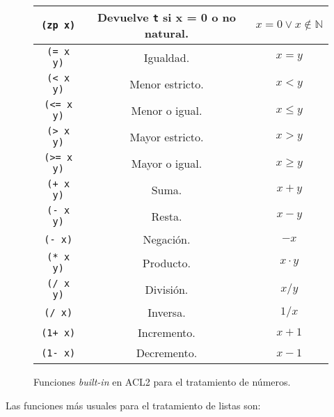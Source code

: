 \documentclass[a4paper,10pt]{article}
\begin{document}
\begin{figure}[ht]
\begin{center}
\begin{tabular}{||c|c|c||}
\hline
\texttt{(zp x)} & Devuelve \texttt{t} si x = 0 o no natural. & $x = 0\vee x \notin \mathbb{N}$\\
\hline
\texttt{(= x y)} & Igualdad. & $x = y$\\
\hline
\texttt{(< x y)} & Menor estricto. & $x < y$\\
\hline
\texttt{(<= x y)} & Menor o igual. & $x \leq y$\\
\hline
\texttt{(> x y)} & Mayor estricto. & $x > y$\\
\hline
\texttt{(>= x y)} & Mayor o igual. & $x \geq y$\\
\hline
\texttt{(+ x y)} & Suma. & $x + y$\\
\hline
\texttt{(- x y)} & Resta. & $x - y$\\
\hline
\texttt{(- x)} & Negación. & $-x$\\
\hline
\texttt{(* x y)} & Producto. & $x\cdot y$\\
\hline
\texttt{(/ x y)} & División. & $x/y$\\
\hline
\texttt{(/ x)} & Inversa. & $1/x$\\
\hline
\texttt{(1+ x)} & Incremento. & $x + 1$\\
\hline
\texttt{(1- x)} & Decremento. & $x - 1$\\
\hline
\end{tabular}
\end{center}
\caption{Funciones \emph{built-in} en ACL2 para el tratamiento de números.}
\end{figure}

\newpage
\par\vspace{10pt}

Las funciones más usuales para el tratamiento de listas son:

\par\vspace{10pt}
\end{document}
